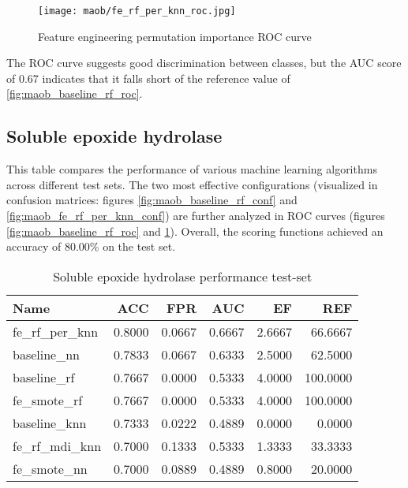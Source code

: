 \begin{figure}[H]
    \begin{center}
        \caption[]{Feature engineering permutation importance ROC curve}
        \label{fig:maob_fe_rf_per_knn_roc}
        \texttt{[image: maob/fe\_rf\_per\_knn\_roc.jpg]}
    \end{center}
\end{figure}
The ROC curve suggests good discrimination between classes, but the AUC score of 0.67 indicates that it falls short of the reference value of \ref*{fig:maob_baseline_rf_roc}.
\subsection{Soluble epoxide hydrolase}
This table compares the performance of various machine learning algorithms across different test sets.
The two most effective configurations (visualized in confusion matrices: figures \ref{fig:maob_baseline_rf_conf} and \ref{fig:maob_fe_rf_per_knn_conf}) 
are further analyzed in ROC curves (figures \ref{fig:maob_baseline_rf_roc} and \ref{fig:maob_fe_rf_per_knn_roc}). 
Overall, the scoring functions achieved an accuracy of 80.00\% on the test set.

\begin{table}[H]
    \begin{center}
        \caption{Soluble epoxide hydrolase performance test-set}
        \begin{tabular}{lrrrrr}
            \toprule
            Name             & ACC    & FPR    & AUC    & EF     & REF      \\
            \midrule
            fe\_rf\_per\_knn & 0.8000 & 0.0667 & 0.6667 & 2.6667 & 66.6667  \\
            baseline\_nn     & 0.7833 & 0.0667 & 0.6333 & 2.5000 & 62.5000  \\
            baseline\_rf     & 0.7667 & 0.0000 & 0.5333 & 4.0000 & 100.0000 \\
            fe\_smote\_rf    & 0.7667 & 0.0000 & 0.5333 & 4.0000 & 100.0000 \\
            baseline\_knn    & 0.7333 & 0.0222 & 0.4889 & 0.0000 & 0.0000   \\
            fe\_rf\_mdi\_knn & 0.7000 & 0.1333 & 0.5333 & 1.3333 & 33.3333  \\
            fe\_smote\_nn    & 0.7000 & 0.0889 & 0.4889 & 0.8000 & 20.0000  \\
            \bottomrule
        \end{tabular}
    \end{center}
\end{table}

